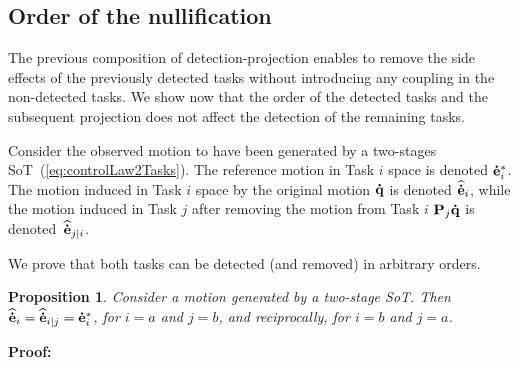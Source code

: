 \documentclass[journal]{IEEEtran}
\newtheorem{proposition}[theorem]{Proposition}
\begin{document}
%
%

\subsection{Order of the nullification}

The previous composition of detection-projection enables to remove the side effects of the previously detected tasks without introducing any coupling in the non-detected tasks. We show now that the order of the detected tasks and the subsequent projection does not affect the detection of the remaining tasks.

Consider the observed motion to have been generated by a two-stages
SoT~(\ref{eq:controlLaw2Tasks}). The reference motion in Task $i$
space is denoted ${\mathbf{\dot{e}}}_{i}^*$. The motion induced in Task $i$ space by the
original motion ${\mathbf{\dot{q}}}$ is denoted ${\mathbf{\widehat{\dot{e}}}}_{i}$, while the motion induced in
Task $j$ after removing the motion from Task $i$ ${\mathbf{P}}_{j} {\mathbf{\dot{q}}}$ is denoted~${\mathbf{\widehat{\dot{e}}}}_{j|i}$.

We prove that both tasks can be detected (and removed)
in arbitrary orders. 

\begin{proposition}
  Consider a motion generated by a two-stage SoT. Then
${\mathbf{\widehat{\dot{e}}}}_{i} = {\mathbf{\widehat{\dot{e}}}}_{i|j} = {\mathbf{\dot{e}}}_{i}^*$, for $i=a$ and $j=b$, and reciprocally, for $i=b$ and $j=a$.
\end{proposition}
\noindent\textbf{Proof:}
\end{document}
